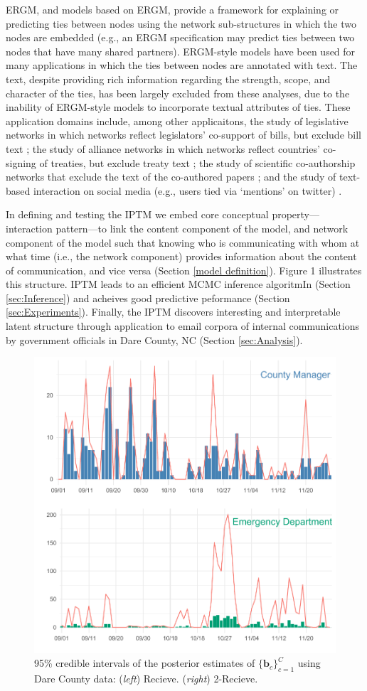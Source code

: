\documentclass{article}
\begin{document}
ERGM, and models based on ERGM, provide a framework for explaining or predicting ties between nodes using the network sub-structures in which the two nodes are embedded (e.g., an ERGM specification may predict ties between two nodes that have many shared partners). ERGM-style models have been used for many applications in which the ties between nodes are annotated with text. The text, despite providing rich information regarding the strength, scope, and character of the ties, has been largely excluded from these analyses, due to the inability of ERGM-style models to incorporate textual attributes of ties. These application domains include, among other applicaitons, the study of legislative networks in which networks reflect legislators' co-support of bills, but exclude bill text \cite{bratton2011networks,aleman2013explaining}; the study of alliance networks in which networks reflect countries' co-signing of treaties, but exclude treaty text \cite{camber2010geometry,cranmer2012complex,cranmer2012toward,kinne2016agreeing}; the study of scientific co-authorship networks that exclude the text of the co-authored papers \cite{kronegger2011collaboration,liang2015changing,fahmy2016gender}; and the study of text-based interaction on social media (e.g., users tied via `mentions' on twitter) \cite{yoon2014strategies,peng2016follower,lai2017connecting}.

In defining and testing the IPTM we embed core conceptual property---interaction pattern---to link the content component of the model, and network component of the model such that knowing who is communicating with whom at what time (i.e., the network component) provides information about the content of communication, and vice versa (Section \ref{model definition}). Figure 1 illustrates this structure. IPTM leads to an efficient MCMC inference algoritmIn (Section \ref{sec:Inference}) and acheives good predictive peformance (Section \ref{sec:Experiments}). Finally, the IPTM discovers interesting and interpretable latent structure through application to email corpora of internal communications by government officials in Dare County, NC (Section \ref{sec:Analysis}). 
\begin{figure}[t]
	\centering
	\includegraphics[width=.49\textwidth]{plots/EDAplot.pdf}  
	\caption{95\% credible intervals of the posterior estimates of $\{\boldsymbol{b}_c\}_{c=1}^C$ using Dare County data: (\textit{left}) Recieve. (\textit{right}) 2-Recieve. }
	\label{fig:b}
\end{figure}
\end{document}
